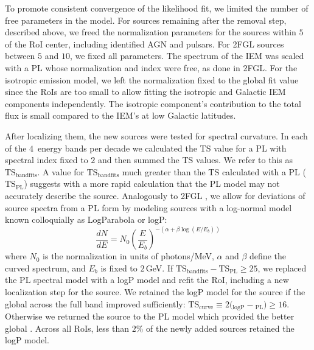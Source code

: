 {To promote consistent convergence of the likelihood fit, we limited the number of free parameters in the model. For sources remaining after the removal step, described above, we freed the normalization parameters for the sources within $5$\degr{} of the RoI center, including identified AGN and pulsars. For 2FGL sources between $5$\degr{} and $10$\degr{}, we fixed all parameters. The spectrum of the IEM was scaled with a PL whose normalization and index were free, as done in 2FGL.
For the isotropic emission model, we left the normalization fixed to the global fit value since the RoIs are too small to allow fitting %
the isotropic and Galactic IEM components independently. The isotropic component's contribution to the total flux is small compared to the IEM's at low Galactic latitudes.

After localizing them, the new sources were tested for spectral curvature. In each of the $4$~energy bands per decade we calculated the TS value for a PL with spectral index fixed to $2$ and then summed the TS values. 
We refer to this as $\mathrm{TS_{band fits}}$. A value for $\mathrm{TS_{band fits}}$ much greater than the TS calculated with a PL ($\mathrm{TS_{PL}}$) suggests with a more rapid calculation that the PL model may not accurately describe the source. %
Analogously to 2FGL \citep{2FGL}, we allow for deviations of source spectra from a PL form by modeling sources with a log-normal model known colloquially as LogParabola or logP:
\begin{equation}
	\newcommand{\pfrac}[2]{\left(\frac{#1}{#2}\right)} \frac{dN}{dE} = N_0\pfrac{E}{E_b}^{-(\alpha + \beta\log(E/E_b))}
	\label{eqn:logP}
\end{equation}
where $N_0$ is the normalization in units of photons/MeV, $\alpha$ and $\beta$ define the curved spectrum, and $E_b$ is fixed to $2$\,GeV. If $\mathrm{TS_{band fits} - TS_{PL}} \geq 25$, we replaced the PL spectral model with a logP model and refit the RoI, including a new localization step for the source. We retained the logP model for the source if the global \logL{} across the full band improved sufficiently: 
$\mathrm{TS_{curve}} \equiv 2 ($\logL{}$_{\mathrm{logP}}-$\logL{}$_{\mathrm{PL}}) \geq 16$. 
Otherwise we returned the source to the PL model which provided the better global \logL. Across all RoIs, less than $2\%$ of the newly added sources retained the logP model. 

}
